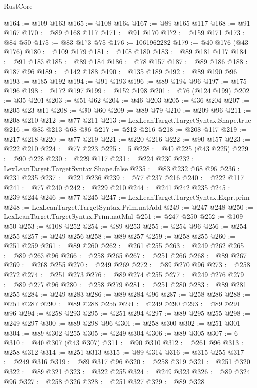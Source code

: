 \begin{lexlean}{RustCore}
\begin{coremodule}
@164 := @109 @163
@165 := @108 @164
@167 := @89 @165 @117
@168 := @91 @167
@170 := @89 @168 @117
@171 := @91 @170
@172 := @159 @171
@173 := @84 @50
@175 := @83 @173 @75
@176 := 1061962282
@179 := @40 @176 (@43 @176)
@180 := @109 @179
@181 := @108 @180
@183 := @89 @181 @117
@184 := @91 @183
@185 := @89 @184
@186 := @78 @157
@187 := @89 @186
@188 := @187 @96
@189 := @142 @188
@190 := @135 @189
@192 := @89 @190 @96
@193 := @185 @192
@194 := @91 @193
@196 := @89 @194 @96
@197 := @175 @196
@198 := @172 @197
@199 := @152 @198
@201 := @76 (@124 @199)
@202 := @35 @201
@203 := @51 @62
@204 := @46 @203
@205 := @36 @204
@207 := @205 @23 @11
@208 := @90 @60
@209 := @89 @79
@210 := @209 @96
@211 := @208 @210
@212 := @77 @211
@213 := LexLeanTarget.TargetSyntax.Shape.true
@216 := @83 @213 @68 @96
@217 := @212 @216
@218 := @208 @117
@219 := @217 @218
@220 := @77 @219
@221 := @220 @216
@222 := @90 @157
@223 := @222 @210
@224 := @77 @223
@225 := 5
@228 := @40 @225 (@43 @225)
@229 := @90 @228
@230 := @229 @117
@231 := @224 @230
@232 := LexLeanTarget.TargetSyntax.Shape.false
@235 := @83 @232 @68 @96
@236 := @231 @235
@237 := @221 @236
@239 := @77 @237 @216
@240 := @222 @117
@241 := @77 @240
@242 := @229 @210
@244 := @241 @242 @235
@245 := @239 @244
@246 := @77 @245
@247 := LexLeanTarget.TargetSyntax.Expr.prim
@248 := LexLeanTarget.TargetSyntax.Prim.natAdd
@249 := @247 @248
@250 := LexLeanTarget.TargetSyntax.Prim.natMul
@251 := @247 @250
@252 := @109 @50
@253 := @108 @252
@254 := @89 @253
@255 := @254 @96
@256 := @254 @255
@257 := @249 @256
@258 := @89 @257
@259 := @258 @255
@260 := @251 @259
@261 := @89 @260
@262 := @261 @255
@263 := @249 @262
@265 := @89 @263 @96
@266 := @258 @265
@267 := @251 @266
@268 := @89 @267
@269 := @268 @255
@270 := @249 @269
@272 := @89 @270 @96
@273 := @258 @272
@274 := @251 @273
@276 := @89 @274 @255
@277 := @249 @276
@279 := @89 @277 @96
@280 := @258 @279
@281 := @251 @280
@283 := @89 @281 @255
@284 := @249 @283
@286 := @89 @284 @96
@287 := @258 @286
@288 := @251 @287
@290 := @89 @288 @255
@291 := @249 @290
@293 := @89 @291 @96
@294 := @258 @293
@295 := @251 @294
@297 := @89 @295 @255
@298 := @249 @297
@300 := @89 @298 @96
@301 := @258 @300
@302 := @251 @301
@304 := @89 @302 @255
@305 := @249 @304
@306 := @89 @305
@307 := 6
@310 := @40 @307 (@43 @307)
@311 := @90 @310
@312 := @261 @96
@313 := @258 @312
@314 := @251 @313
@315 := @89 @314
@316 := @315 @255
@317 := @249 @316
@319 := @89 @317 @96
@320 := @258 @319
@321 := @251 @320
@322 := @89 @321
@323 := @322 @255
@324 := @249 @323
@326 := @89 @324 @96
@327 := @258 @326
@328 := @251 @327
@329 := @89 @328

\end{coremodule}
\end{lexlean}
